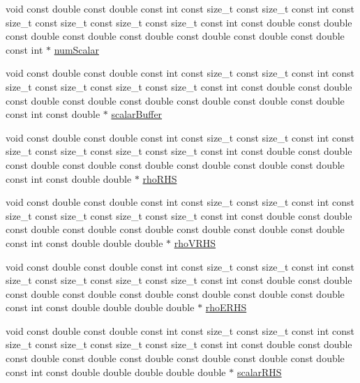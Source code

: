 \begin{DoxyCompactItemize}
\item 
void const double const double const int const size\+\_\+t const size\+\_\+t const int const size\+\_\+t const size\+\_\+t const size\+\_\+t const size\+\_\+t const int const double const double const double const double const double const double const double const double const int $\ast$ \hyperlink{SATKernels_8H_ac97409f480a745850ce5b215aabef12a}{num\+Scalar}
\item 
void const double const double const int const size\+\_\+t const size\+\_\+t const int const size\+\_\+t const size\+\_\+t const size\+\_\+t const size\+\_\+t const int const double const double const double const double const double const double const double const double const int const double $\ast$ \hyperlink{SATKernels_8H_a77f85158b3e3bd2ba599050be5a7b444}{scalar\+Buffer}
\item 
void const double const double const int const size\+\_\+t const size\+\_\+t const int const size\+\_\+t const size\+\_\+t const size\+\_\+t const size\+\_\+t const int const double const double const double const double const double const double const double const double const int const double double $\ast$ \hyperlink{SATKernels_8H_a57216e7c305dcf4eb48881fb0d4a5d78}{rho\+R\+HS}
\item 
void const double const double const int const size\+\_\+t const size\+\_\+t const int const size\+\_\+t const size\+\_\+t const size\+\_\+t const size\+\_\+t const int const double const double const double const double const double const double const double const double const int const double double double $\ast$ \hyperlink{SATKernels_8H_acb9b38017a6743d94bee14616af8c393}{rho\+V\+R\+HS}
\item 
void const double const double const int const size\+\_\+t const size\+\_\+t const int const size\+\_\+t const size\+\_\+t const size\+\_\+t const size\+\_\+t const int const double const double const double const double const double const double const double const double const int const double double double double $\ast$ \hyperlink{SATKernels_8H_a86b34d656c3893a42fbedf44ade01dc7}{rho\+E\+R\+HS}
\item 
void const double const double const int const size\+\_\+t const size\+\_\+t const int const size\+\_\+t const size\+\_\+t const size\+\_\+t const size\+\_\+t const int const double const double const double const double const double const double const double const double const int const double double double double double $\ast$ \hyperlink{SATKernels_8H_a409c39c77cbb195e5f02d1a9e96aa20d}{scalar\+R\+HS}

\end{DoxyCompactItemize}
